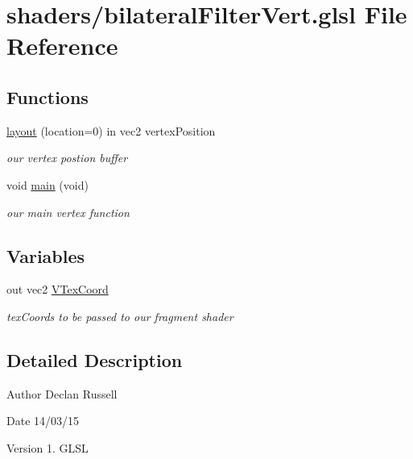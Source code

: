\hypertarget{bilateral_filter_vert_8glsl}{\section{shaders/bilateral\-Filter\-Vert.glsl File Reference}
\label{bilateral_filter_vert_8glsl}
}
\subsection*{Functions}
\begin{DoxyCompactItemize}
\item 
\hyperlink{bilateral_filter_vert_8glsl_a76e82f4a2abee8cef9ec3419ca1ad185}{layout} (location=0) in vec2 vertex\-Position
\begin{DoxyCompactList}\small\item\em our vertex postion buffer \end{DoxyCompactList}\item 
\hypertarget{bilateral_filter_vert_8glsl_a6288eba0f8e8ad3ab1544ad731eb7667}{void \hyperlink{bilateral_filter_vert_8glsl_a6288eba0f8e8ad3ab1544ad731eb7667}{main} (void)}\label{bilateral_filter_vert_8glsl_a6288eba0f8e8ad3ab1544ad731eb7667}

\begin{DoxyCompactList}\small\item\em our main vertex function \end{DoxyCompactList}\end{DoxyCompactItemize}
\subsection*{Variables}
\begin{DoxyCompactItemize}
\item 
\hypertarget{bilateral_filter_vert_8glsl_a849580e4568e3dc8125d8e541b50a483}{out vec2 \hyperlink{bilateral_filter_vert_8glsl_a849580e4568e3dc8125d8e541b50a483}{V\-Tex\-Coord}}\label{bilateral_filter_vert_8glsl_a849580e4568e3dc8125d8e541b50a483}

\begin{DoxyCompactList}\small\item\em tex\-Coords to be passed to our fragment shader \end{DoxyCompactList}\end{DoxyCompactItemize}


\subsection{Detailed Description}
\begin{DoxyAuthor}{Author}
Declan Russell 
\end{DoxyAuthor}
\begin{DoxyDate}{Date}
14/03/15 
\end{DoxyDate}
\begin{DoxyVersion}{Version}
1.  G\-L\-S\-L 
\end{DoxyVersion}


